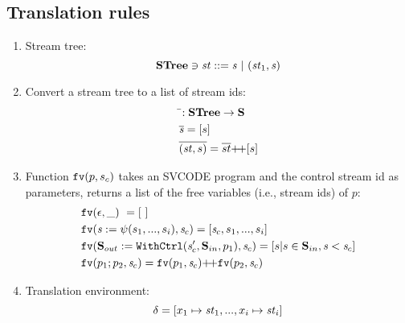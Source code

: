 \subsection{Translation rules}
\begin{enumerate}[(1)]
	\item Stream tree: $$ \STree \ni \st ::= \s \ | \ (\st_1,\s) $$
	\item Convert a stream tree to a list of  stream ids:
	      \begin{align*}
	      &\bar{}: \STree \-> \S \\
	      &\overline{\s} = [s] \\
	      &\overline{(\st,s)} = \overline{st} {\++} [s]
	      \end{align*}
	\item Function $\mathtt{fv}(p,s_c)$ takes an SVCODE program and the control stream id as parameters,
	returns a list of the free variables (i.e., stream ids)  of $p$:
	\begin{align*}
	&\FV{\epsilon}{\_} \ = [ \ ] \\
	&\FV{\sdef{\s}{\psi(s_1,...,s_i)}} {\s_c}  = [\s_c,s_1,...,s_i] \\
	&\FV{\withctrl{\s_c'}{p_1}{\Sin}{\Sout}} {\s_c}  = [s | s \in  \Sin, \s < \s_c] \\
	&\FV{p_1;p_2}{\s_c} = \FV{p_1}{\s_c} {\++}  \FV{p_2}{\s_c}
	\end{align*}
	
	\item Translation environment: $$\del = [x_1 \|-> \st_1,..., x_i \|-> {\st_i}] $$ 
	
	
\end{enumerate}

